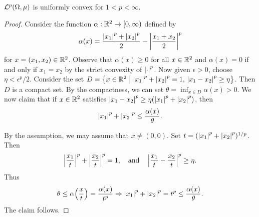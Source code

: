 \begin{theorem}[Clarkson]
    $\mathcal{L}^p(\Omega,\mu)$ is uniformly convex for $1< p <\infty$.
\end{theorem}
\begin{proof}
    Consider the function $\alpha:\mathbb{R}^2\to[0,\infty)$ defined by 
    \begin{equation*}
        \alpha(x) = \frac{\left\lvert {x_1} \right\rvert^p + \left\lvert {x_2} \right\rvert^p}{2} - \left\lvert {\frac{x_1 + x_2}{2}} \right\rvert^p
    \end{equation*}
    for $x = (x_1,x_2)\in\mathbb{R}^2$. Observe that $\alpha(x)\geq 0$ for all
    $x\in\mathbb{R}^2$ and $\alpha(x) = 0$ if and only if $x_1 = x_2$ by the strict 
    convexity of $\left\lvert {\cdot} \right\rvert^p$. Now given $\epsilon>0$, choose $\eta<\epsilon^p/2$. 
    Consider the set $D = \left\{ x\in\mathbb{R}^2 \;\middle\vert\; \left\lvert {x_1} \right\rvert^p + \left\lvert {x_2} \right\rvert^p = 1,\, \left\lvert {x_1-x_2} \right\rvert^p\geq \eta \right\}$. 
    Then $D$ is a compact set. By the compactness, we can set 
    $\theta = \inf_{x\in D}\alpha(x) > 0$. We now claim that if $x\in\mathbb{R}^2$ 
    satisfies $\left\lvert {x_1-x_2} \right\rvert^p\geq \eta(\left\lvert {x_1} \right\rvert^p + \left\lvert {x_2} \right\rvert^p)$, then 
    \begin{equation*}
        \left\lvert {x_1} \right\rvert^p + \left\lvert {x_2} \right\rvert^p \leq \frac{\alpha(x)}{\theta}.
    \end{equation*}

    By the assumption, we may assume that $x\neq (0,0)$. Set 
    $t = (\left\lvert {x_1} \right\rvert^p+\left\lvert {x_2} \right\rvert^p)^{1/p}$. Then 
    \begin{equation*}
        \left\lvert {\frac{x_1}{t}} \right\rvert^p + \left\lvert {\frac{x_2}{t}} \right\rvert^p = 1, 
        \quad \text{and} \quad 
        \left\lvert {\frac{x_1}{t}-\frac{x_2}{t}} \right\rvert^p \geq \eta.
    \end{equation*} 
    Thus 
    \begin{equation*}
        \theta \leq \alpha\pth{\frac{x}{t}} = \frac{\alpha(x)}{t^p}
        \Rightarrow \abs{x_1}^p + \abs{x_2}^p = t^p \leq \frac{\alpha(x)}{\theta}.
    \end{equation*}
    The claim follows. 


\end{proof}
